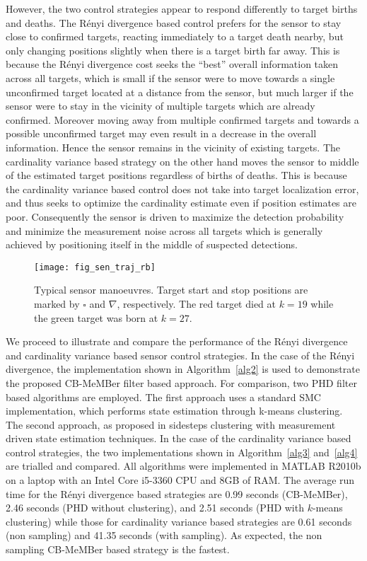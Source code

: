 \documentclass[twocolumn]{autart}
\begin{document}
However, the two control strategies appear to respond differently to target births and deaths. The R\'{e}nyi divergence based control prefers for the sensor to stay close to confirmed targets, reacting immediately to a target death nearby, but only changing positions slightly when there is a target birth far away. This is because the R\'{e}nyi divergence cost seeks the ``best'' overall information taken across all targets, which is small if the sensor were to move towards a single unconfirmed target located at a distance from the sensor, but much larger if the sensor were to stay in the vicinity of multiple targets which are already confirmed. Moreover moving away from multiple confirmed targets and towards a possible unconfirmed target may even result in a decrease in the overall information. Hence the sensor remains in the vicinity of existing targets. The cardinality variance based strategy on the other hand moves the sensor to middle of the estimated target positions regardless of births of deaths. This is because the cardinality variance based control does not take into target localization error, and thus seeks to optimize the cardinality estimate even if position estimates are poor. Consequently the sensor is driven to maximize the detection probability and minimize the measurement noise across all targets which is generally achieved by positioning itself in the middle of suspected detections.
\begin{figure}[htb]
\centering
\texttt{[image: fig\_sen\_traj\_rb]}
\caption{Typical sensor manoeuvres. Target start and stop positions are marked by $\square$ and $\nabla$, respectively. The red target died at $k=19$ while the green target was born at $k=27$.}
\label{fig1}
\end{figure}

We proceed to illustrate and compare the performance of the R\'{e}nyi
divergence and cardinality variance based sensor control strategies. In the case of the R\'{e}nyi
divergence, the implementation shown in Algorithm~\ref{alg2} is used to demonstrate the proposed CB-MeMBer filter based approach. For comparison, two PHD filter based algorithms are employed. The first approach uses a standard SMC implementation, which performs state estimation through k-means clustering. The second approach, as proposed in \cite{RVC11} sidesteps clustering with measurement driven state estimation techniques. In the case of the cardinality variance based control strategies, the two implementations shown in Algorithm~\ref{alg3} and~\ref{alg4} are trialled and compared. All algorithms were implemented in MATLAB R2010b on a laptop with an Intel Core i5-3360 CPU and 8GB of RAM. The average run time for the R\'{e}nyi divergence based strategies are 0.99 seconds (CB-MeMBer), 2.46 seconds (PHD without clustering), and  2.51 seconds (PHD with $k$-means clustering) while those for cardinality variance based strategies are 0.61 seconds (non sampling) and 41.35 seconds (with sampling). As expected, the non sampling CB-MeMBer based strategy is the fastest.
\end{document}
